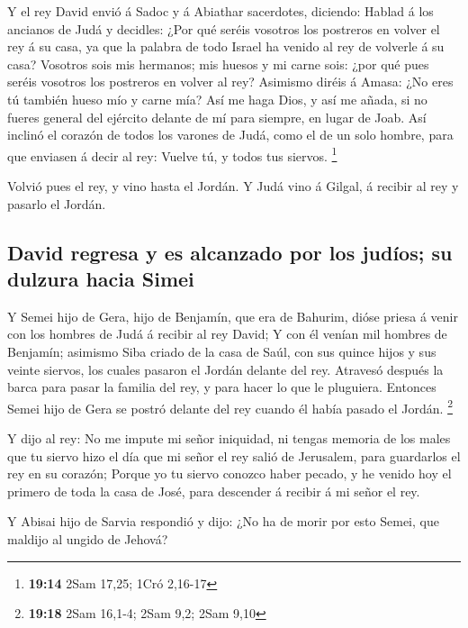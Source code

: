  Y el rey David envió á Sadoc y á Abiathar sacerdotes,
diciendo: Hablad á los ancianos de Judá y decidles: ¿Por qué seréis
vosotros los postreros en volver el rey á su casa, ya que la palabra de
todo Israel ha venido al rey de volverle á su casa? 
Vosotros sois mis hermanos; mis huesos y mi carne sois: ¿por qué pues
seréis vosotros los postreros en volver al rey?  Asimismo
diréis á Amasa: ¿No eres tú también hueso mío y carne mía? Así me haga
Dios, y así me añada, si no fueres general del ejército delante de mí
para siempre, en lugar de Joab.  Así inclinó el corazón
de todos los varones de Judá, como el de un solo hombre, para que
enviasen á decir al rey: Vuelve tú, y todos tus siervos. \footnote{\textbf{19:14}
  2Sam 17,25; 1Cró 2,16-17}

 Volvió pues el rey, y vino hasta el Jordán. Y Judá vino
á Gilgal, á recibir al rey y pasarlo el Jordán.

\hypertarget{david-regresa-y-es-alcanzado-por-los-juduxedos-su-dulzura-hacia-simei}{%
\subsection{David regresa y es alcanzado por los judíos; su dulzura
hacia
Simei}\label{david-regresa-y-es-alcanzado-por-los-juduxedos-su-dulzura-hacia-simei}}

 Y Semei hijo de Gera, hijo de Benjamín, que era de
Bahurim, dióse priesa á venir con los hombres de Judá á recibir al rey
David;  Y con él venían mil hombres de Benjamín; asimismo
Siba criado de la casa de Saúl, con sus quince hijos y sus veinte
siervos, los cuales pasaron el Jordán delante del rey. 
Atravesó después la barca para pasar la familia del rey, y para hacer lo
que le pluguiera. Entonces Semei hijo de Gera se postró delante del rey
cuando él había pasado el Jordán. \footnote{\textbf{19:18} 2Sam 16,1-4;
  2Sam 9,2; 2Sam 9,10}

 Y dijo al rey: No me impute mi señor iniquidad, ni
tengas memoria de los males que tu siervo hizo el día que mi señor el
rey salió de Jerusalem, para guardarlos el rey en su corazón;
 Porque yo tu siervo conozco haber pecado, y he venido
hoy el primero de toda la casa de José, para descender á recibir á mi
señor el rey.

 Y Abisai hijo de Sarvia respondió y dijo: ¿No ha de
morir por esto Semei, que maldijo al ungido de Jehová?

